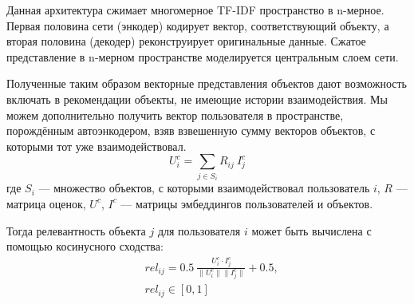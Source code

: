\begin{figure}[h!]
\caption{}
\label{fig:autoencoder_simple}
\end{figure}

Данная архитектура сжимает многомерное TF-IDF пространство в n-мерное.
Первая половина сети (энкодер) кодирует вектор, соответствующий объекту, а вторая половина (декодер) реконструирует оригинальные данные.
Сжатое представление в n-мерном пространстве моделируется центральным слоем сети.

Полученные таким образом векторные представления объектов дают возможность включать в рекомендации объекты, не имеющие истории взаимодействия.
Мы можем дополнительно получить вектор пользователя в пространстве, порождённым автоэнкодером, взяв взвешенную сумму векторов объектов, с которыми тот уже взаимодействовал.
\begin{equation}\label{eq:content-user-emb}
        U_{i}^{c} = \sum_{j \in S_i}{R_{ij}~I_{j}^{c}}
\end{equation}
где $S_i$ --- множество объектов, с которыми взаимодействовал пользователь $i$,
$R$ --- матрица оценок,
$U^c$, $I^c$ --- матрицы эмбеддингов пользователей и объектов.

Тогда релевантность объекта $j$ для пользователя $i$ может быть вычислена с помощью косинусного сходства:
\begin{equation}\label{eq:content-user-rel}
    \begin{aligned}
        & rel_{ij} = 0.5~\frac{U_{i}^{c} \cdot I_{j}^{c}}{\| U_{i}^{c} \| \| I_{j}^{c} \|} + 0.5, \\
        & rel_{ij} \in [0, 1]
    \end{aligned}
\end{equation}

